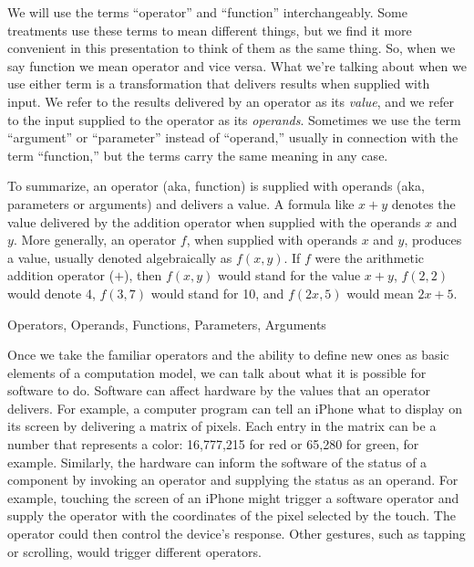 \begin{aside}
We will use the terms ``operator'' and ``function'' interchangeably.
Some treatments use these terms to mean different things,
but we find it more convenient in this presentation
to think of them as the same thing.
So, when we say function we mean operator and vice versa.
What we're talking about when we use either term
is a transformation that delivers results when supplied with input.
We refer to the results delivered by an operator as its \emph{value},
and we refer to the input supplied 
to the operator as its \emph{operands}.
Sometimes we use the term ``argument''
or ``parameter'' instead of ``operand,''
usually in connection with the term ``function,''
but the terms carry the same meaning in any case.

To summarize, an operator (aka, function) is supplied with operands
(aka, parameters or arguments) and delivers a value.
A formula like $x + y$ denotes the value delivered
by the addition operator when supplied with the operands $x$ and $y$.
More generally, an operator $f$, when supplied with operands $x$ and $y$,
produces a value, usually denoted algebraically as $f(x,y)$.
If $f$ were the arithmetic addition operator ($+$),
then $f(x,y)$ would stand for the value $x+y$, $f(2,2)$ would denote 4,
$f(3,7)$ would stand for 10, and $f(2x,5)$ would mean $2x+5$.

\caption{Operators, Operands, Functions, Parameters, Arguments}
\label{operations-and-functions}
\end{aside}

Once we take the familiar operators
and the ability to define new ones
as basic elements of a computation model,
we can talk about what it is possible for software to do.
Software can affect
hardware by the values that an operator delivers.
For example, a computer program can tell an iPhone what to display
on its screen by delivering a matrix of pixels.
Each entry in the matrix
can be a number that represents a color: 16,777,215 for
red or 65,280 for green, for example.
Similarly, the hardware can inform the
software of the status of a component by
invoking an operator and supplying the status as an operand.
For example, touching the screen of an iPhone might
trigger a software operator and supply the operator with
the coordinates of the pixel selected by the touch.
The operator could then control the device's response.
Other gestures, such as tapping or
scrolling, would trigger different operators.

